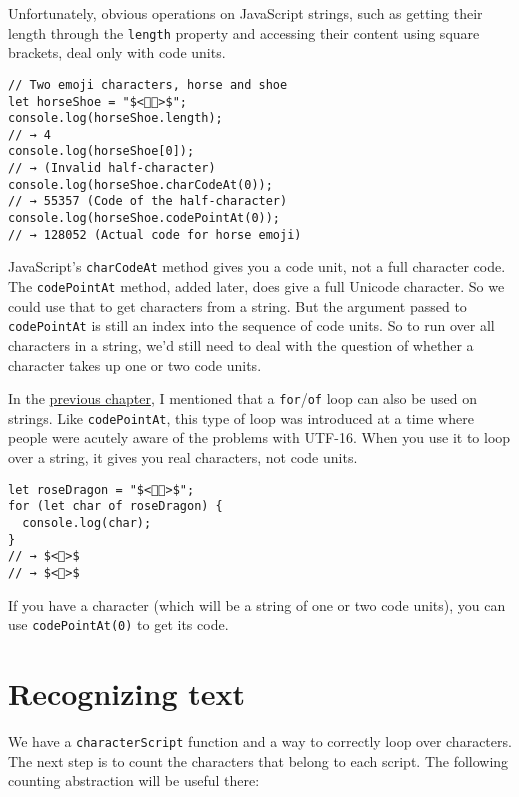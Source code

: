 Unfortunately, obvious operations on JavaScript strings, such as getting their length through the \lstinline`length` property and accessing their content using square brackets, deal only with code units.

\begin{lstlisting}
// Two emoji characters, horse and shoe
let horseShoe = "$<🐴👟>$";
console.log(horseShoe.length);
// → 4
console.log(horseShoe[0]);
// → (Invalid half-character)
console.log(horseShoe.charCodeAt(0));
// → 55357 (Code of the half-character)
console.log(horseShoe.codePointAt(0));
// → 128052 (Actual code for horse emoji)
\end{lstlisting}
\noindent{}

JavaScript's \lstinline`charCodeAt` method gives you a code unit, not a full character code. The \lstinline`codePointAt` method, added later, does give a full Unicode character. So we could use that to get characters from a string. But the argument passed to \lstinline`codePointAt` is still an index into the sequence of code units. So to run over all characters in a string, we'd still need to deal with the question of whether a character takes up one or two code units.

In the \hyperref[data.for_of_loop]{previous chapter}, I mentioned that a \lstinline`for`/\lstinline`of` loop can also be used on strings. Like \lstinline`codePointAt`, this type of loop was introduced at a time where people were acutely aware of the problems with UTF-16. When you use it to loop over a string, it gives you real characters, not code units.

\begin{lstlisting}
let roseDragon = "$<🌹🐉>$";
for (let char of roseDragon) {
  console.log(char);
}
// → $<🌹>$
// → $<🐉>$
\end{lstlisting}
\noindent

If you have a character (which will be a string of one or two code units), you can use \lstinline`codePointAt(0)` to get its code.

\section{Recognizing text}

We have a \lstinline`characterScript` function and a way to correctly loop over characters. The next step is to count the characters that belong to each script. The following counting abstraction will be useful there:

